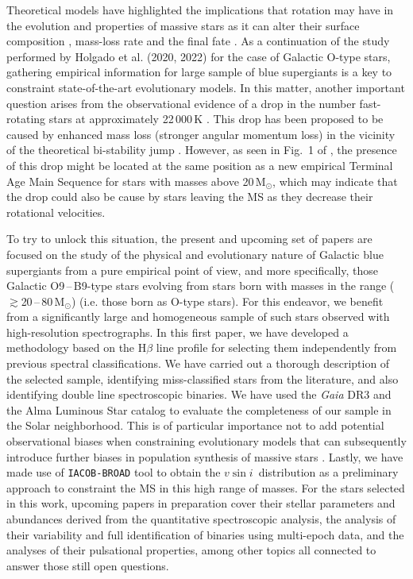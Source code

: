 \documentclass{aa}
\newcommand{\vsini}{\mbox{$v\sin i$}}
\newcommand{\MSol}{\mbox{M$_\odot$}}
\newcommand{\gs}{\mbox{$\gtrsim$}}
\begin{document}
Theoretical models have highlighted the implications that rotation may have in the evolution and properties of massive stars \citep{2000ARA&A..38..143M,2012ARA&A..50..107L} as it can alter their surface composition \citep{2000ApJ...544.1016H,2005A&A...440.1041M,2009A&A...496..841H}, mass-loss rate \citep{2008A&ARv..16..209P} and the final fate \citep{2005A&A...429..581M}. As a continuation of the study performed by Holgado et al. (2020, 2022) for the case of Galactic O-type stars, gathering empirical information for large sample of blue supergiants is a key to constraint state-of-the-art evolutionary models. In this matter, another important question arises from the observational evidence of a drop in the number fast-rotating stars at approximately 22\,000\,K \citep{2010A&A...512L...7V}. This drop has been proposed to be caused by enhanced mass loss (stronger angular momentum loss) in the vicinity of the theoretical bi-stability jump \citep{2000A&A...362..295V}. However, as seen in Fig.~1 of \citet{2014A&A...570L..13C}, the presence of this drop might be located at the same position as a new empirical Terminal Age Main Sequence for stars with masses above 20\,\MSol, which may indicate that the drop could also be cause by stars leaving the MS as they decrease their rotational velocities.

To try to unlock this situation, the present and upcoming set of papers are focused on the study of the physical and evolutionary nature of Galactic blue supergiants from a pure empirical point of view, and more specifically, those Galactic O9\,--\,B9-type stars evolving from stars born with masses in the range (\gs20\,--\,80\,\MSol) (i.e. those born as O-type stars). For this endeavor, we benefit from a significantly large and homogeneous sample of such stars observed with high-resolution spectrographs. In this first paper, we have developed a methodology based on the H$\beta$ line profile for selecting them independently from previous spectral classifications. We have carried out a thorough description of the selected sample, identifying miss-classified stars from the literature, and also identifying double line spectroscopic binaries. We have used the {\em Gaia} DR3 \citep{2016A&A...595A...1G,2022arXiv220800211G,2022arXiv220605989B} and the Alma Luminous Star catalog \citep[ALS~III, Pantaleoni González, et al., in prep.;][]{2021MNRAS.504.2968P} to evaluate the completeness of our sample in the Solar neighborhood. This is of particular importance not to add potential observational biases when constraining evolutionary models that can subsequently introduce further biases in population synthesis of massive stars \citep[e.g.][]{2009A&A...504..531V}. Lastly, we have made use of {\tt IACOB-BROAD} \citep{2014A&A...562A.135S} tool to obtain the \vsini\ distribution as a preliminary approach to constraint the MS in this high range of masses. For the stars selected in this work, upcoming papers in preparation cover their stellar parameters and abundances derived from the quantitative spectroscopic analysis, the analysis of their variability and full identification of binaries using multi-epoch data, and the analyses of their pulsational properties, among other topics all connected to answer those still open questions.
\end{document}
